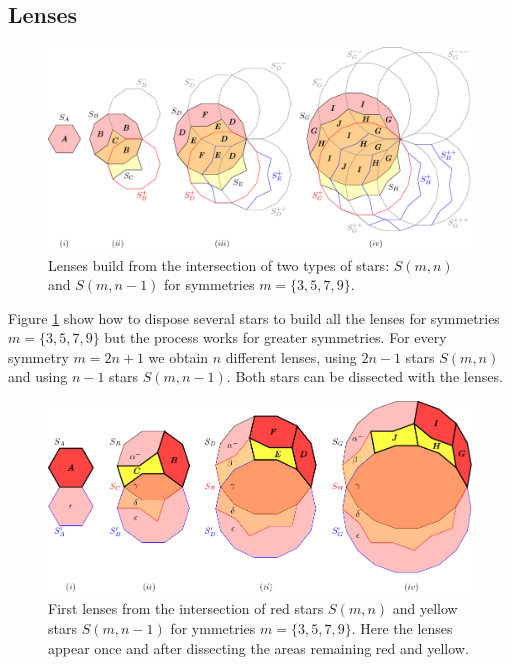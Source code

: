\documentclass[11pt]{article}
\begin{document}
\subsection{Lenses}

\begin{figure}[H]
\centering
\includegraphics[scale=1]{stars/inter-a}
\caption{Lenses build from the intersection of two types of stars: $S(m,n)$ and $S(m,n-1)$ for symmetries $m=\{3,5,7,9\}$. }
\label{fig:stars-inter-a}
\end{figure}

Figure \ref{fig:stars-inter-a} show how to dispose several stars to build all the lenses for symmetries $m=\{3,5,7,9\}$ but the process works for greater symmetries. For every symmetry $m=2n+1$ we obtain $n$ different lenses, using $2n-1$ stars $S(m,n)$ and using $n-1$ stars $S(m,n-1)$. Both stars can be dissected with the lenses.


\begin{figure}[H]
\centering
\includegraphics[scale=1]{stars/inter-2}
\caption{First lenses from the intersection of red stars $S(m,n)$ and yellow stars $S(m,n-1)$ for ymmetries $m=\{3,5,7,9\}$. Here the lenses appear once and after dissecting the areas remaining red and yellow.}
\label{fig:stars-inter-1}
\end{figure}
\end{document}
